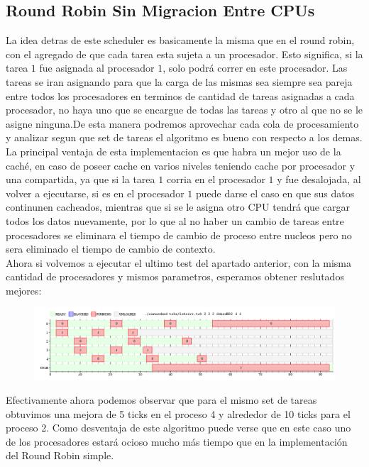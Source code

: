 \subsection{Round Robin Sin Migracion Entre CPUs}
La idea detras de este scheduler es basicamente la misma que en el round robin, con el agregado de que cada tarea esta sujeta a un procesador. Esto significa, si la tarea $1$ fue asignada al procesador $1$, solo podrá correr en este procesador. Las tareas se iran asignando para que la carga de las mismas sea siempre sea  pareja entre todos los procesadores en terminos de cantidad de tareas asignadas a cada procesador, no haya uno que se encargue de todas las tareas y otro al que no se le asigne ninguna.De esta manera podremos aprovechar cada cola de procesamiento y analizar segun que set de tareas el algoritmo es bueno con respecto a los demas.
\\
La principal ventaja de esta implementacion es que habra un mejor uso de la caché, en caso de poseer cache en varios niveles teniendo cache por procesador y una compartida, ya que si la tarea $1$ corria en el procesador $1$ y fue desalojada, al volver a ejecutarse, si es en el procesador $1$ puede darse el caso en que sus datos continunen cacheados, mientras que si se le asigna otro CPU tendrá que cargar todos los datos nuevamente, por lo que al no haber un cambio de tareas entre procesadores se eliminara el tiempo de cambio de proceso entre nucleos  pero no sera eliminado el tiempo de cambio de contexto.
\\
Ahora si volvemos a ejecutar el ultimo test del apartado anterior, con la misma cantidad de procesadores y mismos parametros, esperamos obtener reslutados mejores:
\\
\begin{figure}[H]
  \centering
\includegraphics[scale=0.45]{graficos/parte2/rr2/1.png}
  \caption[Caption for LOF]{}
\end{figure}
Efectivamente ahora podemos observar que para el mismo set de tareas obtuvimos una mejora de 5 ticks en el proceso 4 y alrededor de 10 ticks para el proceso 2. Como desventaja de este algoritmo puede verse que en este caso uno de los procesadores estará ocioso mucho más tiempo que en la implementación del Round Robin simple.
